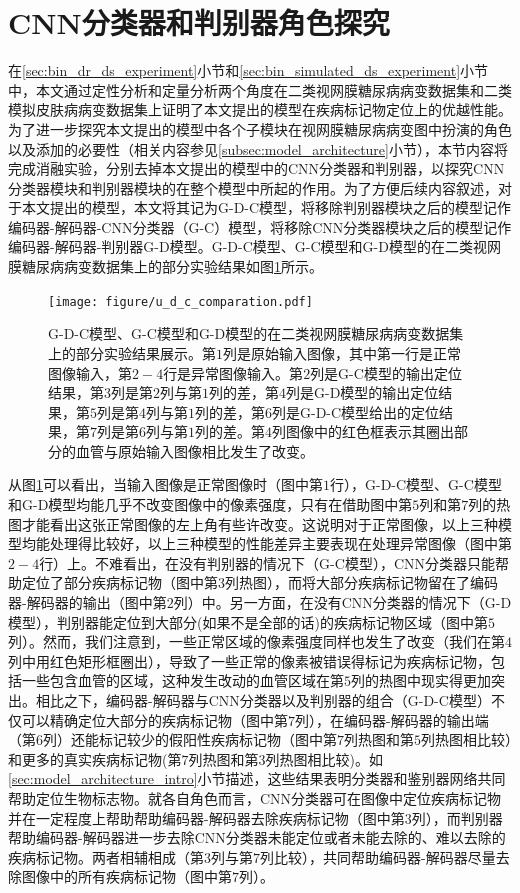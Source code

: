 \section{CNN分类器和判别器角色探究}\label{sec:g_c_g_d_g_d_c_comparsion}
在\ref{sec:bin_dr_ds_experiment}小节和\ref{sec:bin_simulated_ds_experiment}小节中，本文通过定性分析和定量分析两个角度在二类视网膜糖尿病病变数据集和二类模拟皮肤病病变数据集上证明了本文提出的模型在疾病标记物定位上的优越性能。为了进一步探究本文提出的模型中各个子模块在视网膜糖尿病病变图中扮演的角色以及添加的必要性（相关内容参见\ref{subsec:model_architecture}小节），本节内容将完成消融实验，分别去掉本文提出的模型中的CNN分类器和判别器，以探究CNN分类器模块和判别器模块的在整个模型中所起的作用。为了方便后续内容叙述，对于本文提出的模型，本文将其记为G-D-C模型，将移除判别器模块之后的模型记作编码器-解码器-CNN分类器（G-C）模型，将移除CNN分类器模块之后的模型记作编码器-解码器-判别器G-D模型。G-D-C模型、G-C模型和G-D模型的在二类视网膜糖尿病病变数据集上的部分实验结果如图\ref{fig:u_d_c_comparation}所示。
\begin{figure}[h]
	\centering
	\texttt{[image: figure/u\_d\_c\_comparation.pdf]}
	\caption{G-D-C模型、G-C模型和G-D模型的在二类视网膜糖尿病病变数据集上的部分实验结果展示。第$1$列是原始输入图像，其中第一行是正常图像输入，第$2-4$行是异常图像输入。第$2$列是G-C模型的输出定位结果，第$3$列是第$2$列与第$1$列的差，第$4$列是G-D模型的输出定位结果，第$5$列是第$4$列与第$1$列的差，第$6$列是G-D-C模型给出的定位结果，第$7$列是第$6$列与第$1$列的差。第$4$列图像中的红色框表示其圈出部分的血管与原始输入图像相比发生了改变。} 
	\label{fig:u_d_c_comparation}
\end{figure}

从图\ref{fig:u_d_c_comparation}可以看出，当输入图像是正常图像时（图中第$1$行），G-D-C模型、G-C模型和G-D模型均能几乎不改变图像中的像素强度，只有在借助图中第$5$列和第$7$列的热图才能看出这张正常图像的左上角有些许改变。这说明对于正常图像，以上三种模型均能处理得比较好，以上三种模型的性能差异主要表现在处理异常图像（图中第$2-4$行）上。不难看出，在没有判别器的情况下（G-C模型），CNN分类器只能帮助定位了部分疾病标记物（图中第$3$列热图），而将大部分疾病标记物留在了编码器-解码器的输出（图中第$2$列）中。另一方面，在没有CNN分类器的情况下（G-D模型），判别器能定位到大部分(如果不是全部的话)的疾病标记物区域（图中第$5$列）。然而，我们注意到，一些正常区域的像素强度同样也发生了改变（我们在第$4$列中用红色矩形框圈出），导致了一些正常的像素被错误得标记为疾病标记物，包括一些包含血管的区域，这种发生改动的血管区域在第$5$列的热图中现实得更加突出。相比之下，编码器-解码器与CNN分类器以及判别器的组合（G-D-C模型）不仅可以精确定位大部分的疾病标记物（图中第$7$列），在编码器-解码器的输出端（第$6$列）还能标记较少的假阳性疾病标记物（图中第$7$列热图和第$5$列热图相比较）和更多的真实疾病标记物(第$7$列热图和第$3$列热图相比较)。如\ref{sec:model_architecture_intro}小节描述，这些结果表明分类器和鉴别器网络共同帮助定位生物标志物。就各自角色而言，CNN分类器可在图像中定位疾病标记物并在一定程度上帮助帮助编码器-解码器去除疾病标记物（图中第$3$列），而判别器帮助编码器-解码器进一步去除CNN分类器未能定位或者未能去除的、难以去除的疾病标记物。两者相辅相成（第$3$列与第$7$列比较），共同帮助编码器-解码器尽量去除图像中的所有疾病标记物（图中第$7$列）。

